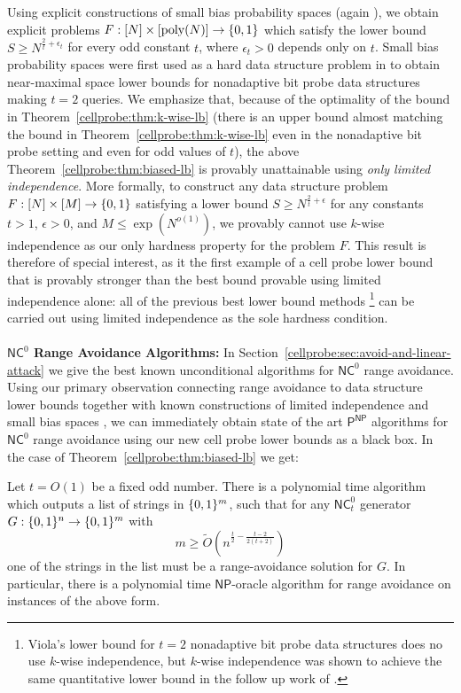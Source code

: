 Using explicit constructions of small bias probability spaces (again \cite{naornaor}), we obtain explicit problems $F: [N] \times [\mathrm{poly}(N)] \to \{0,1\}$ which satisfy the lower bound $S \geq N^{\frac{2}{t} + \epsilon_t}$ for every odd constant $t$, where $\epsilon_t>0$ depends only on $t$. Small bias probability spaces were first used as a hard data structure problem in \cite{viola-maximal} to obtain near-maximal space lower bounds for nonadaptive bit probe data structures making $t=2$ queries. 
We emphasize that, because of the optimality of the bound in Theorem~\ref{cellprobe:thm:k-wise-lb} (there is an upper bound almost matching the bound in Theorem~\ref{cellprobe:thm:k-wise-lb} even in the nonadaptive bit probe setting and even for odd values of $t$), the above Theorem~\ref{cellprobe:thm:biased-lb} is provably unattainable using \emph{only limited independence}. More formally, to construct any data structure problem $F: [N] \times [M] \to \{0,1\}$ satisfying a lower bound $S \geq N^{\frac{2}{t} + \epsilon}$ for any constants $t > 1$, $\epsilon>0$, and $M \leq \exp(N^{o(1)})$, we provably cannot use $k$-wise independence as our only hardness property for the problem $F$. This result is therefore of special interest, as it the first example of a cell probe lower bound that is provably stronger than the best bound provable using limited independence alone: all of the previous best lower bound methods \cite{Siegel89,panigrahy,kasper,viola-maximal,golovnev}\footnote{Viola's lower bound for $t=2$ nonadaptive bit probe data structures \cite{viola-maximal} does no use $k$-wise independence, but $k$-wise independence was shown to achieve the same quantitative lower bound in the follow up work of \cite{golovnev}.} can be carried out using limited independence as the sole hardness condition.
~\\~\\
{\bf \noindent $\mathsf{NC}^0$ Range Avoidance Algorithms:}
In Section~\ref{cellprobe:sec:avoid-and-linear-attack} we give the best known unconditional algorithms for $\mathsf{NC}^0$ range avoidance. Using our primary observation connecting range avoidance to data structure lower bounds together with known constructions of limited independence and small bias spaces \cite{naornaor}, we can immediately obtain state of the art $\mathsf{P^{NP}}$ algorithms for $\mathsf{NC}^0$ range avoidance using our new cell probe lower bounds as a black box. In the case of Theorem~\ref{cellprobe:thm:biased-lb} we get:

\begin{theorem}

Let $t = O(1)$ be a fixed odd number. There is a polynomial time algorithm which outputs a list of strings in $\{0,1\}^m$, such that for any $\mathsf{NC}^0_t$ generator $G: \{0,1\}^n \to \{0,1\}^m$ with
\[
m \geq  \tilde{O}( n^{\frac{t}{2} - \frac{t-2}{2(t+2)}})
\]
one of the strings in the list must be a range-avoidance solution for $G$. In particular, there is a polynomial time $\mathsf{NP}$-oracle algorithm for range avoidance on instances of the above form.
\end{theorem}


